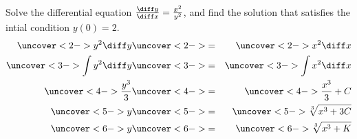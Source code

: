 \begin{frame}
\begin{example} %
Solve the differential equation $\frac{\diff y}{\diff x} = \frac{x^2}{y^2}$, and find the solution that satisfies the intial condition $y(0) = 2$.
\belowdisplayskip=0pt
\begin{eqnarray*}
\uncover<2->{%
y^2 \diff y %
}%
& \uncover<2->{ = } &%
\uncover<2->{%
x^2 \diff x %
}\\%
\uncover<3->{%
\int y^2 \diff y %
}%
& \uncover<3->{ = } &%
\uncover<3->{%
\int x^2 \diff x %
}\\%
\uncover<4->{%
\frac{y^3}{3}%
}%
& \uncover<4->{ = } &%
\uncover<4->{%
\frac{x^3}{3} + C
}\\%
\uncover<5->{%
y%
}%
& \uncover<5->{ = } &%
\uncover<5->{%
\sqrt[3]{x^3 + 3C}%
}\\%
\uncover<6->{%
y%
}%
& \uncover<6->{ = } &%
\uncover<6->{%
\sqrt[3]{x^3 + K}%
}%
\end{eqnarray*}
%
%
%
\end{example}
\end{frame}
